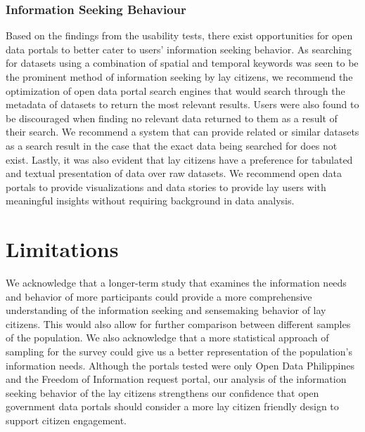 \documentclass{sigchi}
\begin{document}
\subsubsection{Information Seeking Behaviour}
Based on the findings from the usability tests, there exist opportunities for open data portals to better cater to users' information seeking behavior. As searching for datasets using a combination of spatial and temporal keywords was seen to be the prominent method of information seeking by lay citizens, we recommend the optimization of open data portal search engines that would search through the metadata of datasets to return the most relevant results. Users were also found to be discouraged when finding no relevant data returned to them as a result of their search. We recommend a system that can provide related or similar datasets as a search result in the case that the exact data being searched for does not exist. Lastly, it was also evident that lay citizens have a preference for tabulated and textual presentation of data over raw datasets. We recommend open data portals to provide visualizations and data stories to provide lay users with meaningful insights without requiring background in data analysis.

\section{Limitations}
We acknowledge that a longer-term study that examines the information needs and behavior of more participants could provide a more comprehensive understanding of the information seeking and sensemaking behavior of lay citizens. This would also allow for further comparison between different samples of the population. We also acknowledge that a more statistical approach of sampling for the survey could give us a better representation of the population's information needs. Although the portals tested were only Open Data Philippines and the Freedom of Information request portal, our analysis of the information seeking behavior of the lay citizens strengthens our confidence that open government data portals should consider a more lay citizen friendly design to support citizen engagement.
\end{document}
